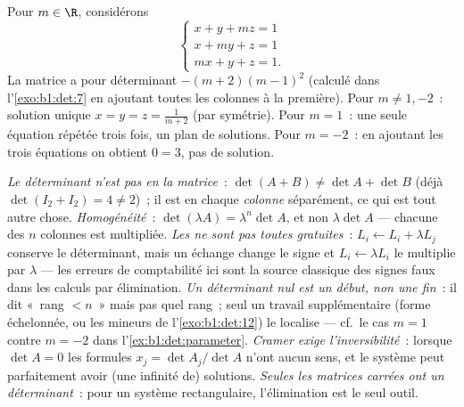 \begin{example}\label{ex:b1:det:parameter}
Pour $m \in \R$, considérons
\[
\begin{cases}
x + y + mz = 1\\
x + my + z = 1\\
mx + y + z = 1 .
\end{cases}
\]
La matrice a pour déterminant $-(m+2)(m-1)^2$ (calculé dans
l'\cref{exo:b1:det:7} en ajoutant toutes les colonnes à la première).
Pour $m \neq 1, -2$~: solution unique
$x = y = z = \frac{1}{m+2}$ (par symétrie). Pour $m =
1$~: une seule équation répétée trois fois, un plan de solutions. Pour
$m = -2$~: en ajoutant les trois équations on obtient $0 = 3$, pas de
solution.
\end{example}

\begin{remark}
\label{rem:b1:det:pitfalls}
\emph{Le déterminant n'est pas  en la matrice}~: $\det(A + B)
\neq \det A + \det B$ (déjà $\det(I_2 + I_2) = 4 \neq 2$)~; il est
 en chaque \emph{colonne} séparément, ce qui est tout autre
chose.
\emph{Homogénéité}~: $\det(\lambda A) = \lambda^n\det A$, et non
$\lambda\det A$ --- chacune des $n$ colonnes est multipliée.
\emph{Les  ne sont pas toutes gratuites}~:
$L_i \leftarrow L_i + \lambda L_j$ conserve le déterminant, mais un
échange change le signe et $L_i \leftarrow \lambda L_i$ le multiplie
par $\lambda$ --- les erreurs de comptabilité ici sont la source
classique des signes faux dans les calculs par élimination.
\emph{Un déterminant nul est un début, non une fin}~: il dit
«~rang $< n$~» mais pas quel rang~; seul un travail supplémentaire
(forme échelonnée, ou les mineurs de l'\cref{exo:b1:det:12}) le localise
--- cf.\ le cas $m = 1$ contre $m = -2$ dans
l'\cref{ex:b1:det:parameter}.
\emph{Cramer exige l'inversibilité}~: lorsque $\det A = 0$ les
formules $x_j = \det A_j/\det A$ n'ont aucun sens, et le système peut
parfaitement avoir (une infinité de) solutions.
\emph{Seules les matrices carrées ont un déterminant}~: pour un
système rectangulaire, l'élimination est le seul outil.
\end{remark}

